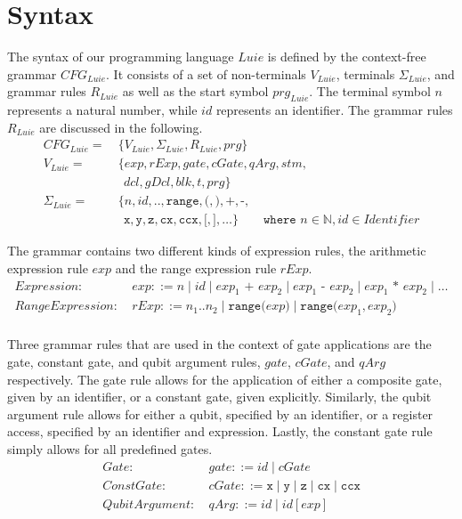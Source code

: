 \section{Syntax}
\label{sec:concept_abstractGrammar}
The syntax of our programming language $Luie$ is defined by the context-free grammar $CFG_{Luie}$. It consists of a set of non-terminals $V_{Luie}$, terminals $\Sigma_{Luie}$, and grammar rules $R_{Luie}$ as well as the start symbol $prg_{Luie}$. The terminal symbol $n$ represents a natural number, while $id$ represents an identifier. The grammar rules $R_{Luie}$ are discussed in the following.
\begin{align*}
    CFG_{Luie} = \ & \{V_{Luie}, \Sigma_{Luie}, R_{Luie}, prg \}\\ 
    V_{Luie} = \ & \{ exp, rExp, gate, cGate, qArg, stm,\\ 
            & \ \  dcl, gDcl, blk, t, prg\}\\ 
    \Sigma_{Luie} = \ & \{n, id, \texttt{..}, \texttt{range}, \texttt{(}, \texttt{)}, \texttt{+}, \texttt{-}, \\
               & \ \ \texttt{x}, \texttt{y}, \texttt{z}, \texttt{cx}, \texttt{ccx}, \texttt{[}, \texttt{]}, \dots \} \quad \quad \texttt{where } n \in \mathbb{N}, id \in Identifier
\end{align*}

The grammar contains two different kinds of expression rules, the arithmetic expression rule $exp$ and the range expression rule $rExp$.
\begin{align*}
    Expression: \ & exp ::= n \mid id \mid exp_1 \texttt{ + } exp_2 \mid exp_1 \texttt{ - } exp_2 \mid exp_1 \texttt{ * } exp_2 \mid \dots\\
    RangeExpression: \ & rExp ::= n_1 .. n_2 \mid \texttt{range(} exp \texttt{)} \mid \texttt{range(} exp_1, exp_2 \texttt{)}\\
\end{align*}

Three grammar rules that are used in the context of gate applications are the gate, constant gate, and qubit argument rules, $gate$, $cGate$, and $qArg$ respectively. The gate rule allows for the application of either a composite gate, given by an identifier, or a constant gate, given explicitly. Similarly, the qubit argument rule allows for either a qubit, specified by an identifier, or a register access, specified by an identifier and expression. Lastly, the constant gate rule simply allows for all predefined gates. 
\begin{align*}
    Gate: \ & gate ::= id \mid cGate\\
    ConstGate: \ & cGate ::= \texttt{x} \mid \texttt{y} \mid \texttt{z} \mid \texttt{cx} \mid \texttt{ccx}\\
    QubitArgument: \ & qArg ::= id \mid id[exp]\\
\end{align*}

